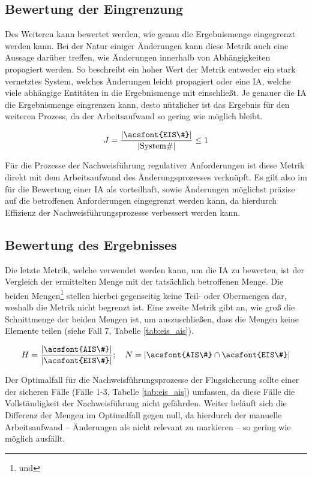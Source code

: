 \pagebreak
\subsection{Bewertung der Eingrenzung}
    
    Des Weiteren kann bewertet werden, wie genau die Ergebnismenge eingegrenzt werden kann.
    Bei der Natur einiger Änderungen kann diese Metrik auch eine Aussage darüber treffen, wie Änderungen innerhalb von Abhängigkeiten propagiert werden. 
    So beschreibt ein hoher Wert der Metrik entweder ein stark vernetztes System, welches Änderungen leicht propagiert oder eine \ac{IA}, welche viele abhängige Entitäten in die Ergebnismenge mit einschließt.
    Je genauer die \ac{IA} die Ergebnismenge eingrenzen kann, desto nützlicher ist das Ergebnis für den weiteren Prozess, da der Arbeitsaufwand so gering wie möglich bleibt. 
    
    $$
        J = \dfrac{|\text{\acsfont{EIS\#}}|}{|\text{System\#}|} \leq 1
    $$

    \noindent
    Für die Prozesse der Nachweisführung regulativer Anforderungen ist diese Metrik direkt mit dem Arbeitsaufwand des Änderungsprozesses verknüpft.
    Es gilt also im für die Bewertung einer \ac{IA} als vorteilhaft, sowie Änderungen möglichst präzise auf die betroffenen Anforderungen eingegrenzt werden kann, da hierdurch Effizienz der Nachweisführungsprozesse verbessert werden kann.
    
    

\subsection{Bewertung des Ergebnisses}
    
    Die letzte Metrik, welche verwendet werden kann, um die \ac{IA} zu bewerten, ist der Vergleich der ermittelten Menge mit der tatsächlich betroffenen Menge.
    Die beiden Mengen\footnote{ und } stellen hierbei gegenseitig keine Teil- oder Obermengen dar, weshalb die Metrik nicht begrenzt ist.
    Eine zweite Metrik gibt an, wie groß die Schnittmenge der beiden Mengen ist, um auszuschließen, dass die Mengen keine Elemente teilen (siehe Fall 7, Tabelle \ref{tab:eis_ais}). 
    
    $$
        H = \dfrac{|\text{\acsfont{AIS\#}}|}{|\text{\acsfont{EIS\#}}|}; \quad
        N = |\acsfont{AIS\#} \cap \acsfont{EIS\#}|
    $$

    \noindent
    Der Optimalfall für die Nachweisführungsprozesse der Flugsicherung sollte einer der sicheren Fälle (Fälle 1-3, Tabelle \ref{tab:eis_ais}) umfassen, da diese Fälle die Vollständigkeit der Nachweisführung nicht gefährden.
    Weiter beläuft sich die Differenz der Mengen im Optimalfall gegen null, da hierdurch der manuelle Arbeitsaufwand -- Änderungen als nicht relevant zu markieren -- so gering wie möglich ausfällt.
    \bigskip
    
    

